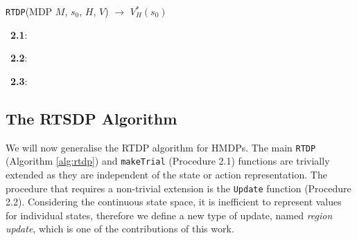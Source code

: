 \vspace{-2mm}
\begin{algorithm}[th!]
\small
\DontPrintSemicolon
\caption{\texttt{RTDP}(MDP $\mathit{M}$, $s_0$, $H$, $V$) $\longrightarrow$ $V^*_H(s_0)$ \label{alg:rtdp}}

      \;
\vspace{4mm}

\setcounter{AlgoLine}{0}
\myproc~{\bf 2.1}:~
\vspace{4mm}

\setcounter{AlgoLine}{0}
\myproc~{\bf 2.2}:~
\vspace{4mm}

\setcounter{AlgoLine}{0}
\myproc~{\bf 2.3}:~

\end{algorithm}
\vspace{-6mm}

\subsection{The RTSDP Algorithm}

We will now generalise the RTDP algorithm for HMDPs.
The main \texttt{RTDP} (Algorithm \ref{alg:rtdp}) and \texttt{makeTrial} (Procedure 2.1) functions are trivially extended as they are independent of the state or action representation. %
The procedure that requires a non-trivial extension is the \texttt{Update} function (Procedure 2.2).
Considering the continuous state space, it is inefficient to represent values for individual states, therefore we define a new type of update, named \emph{region update}, which is one of the contributions of this work.

